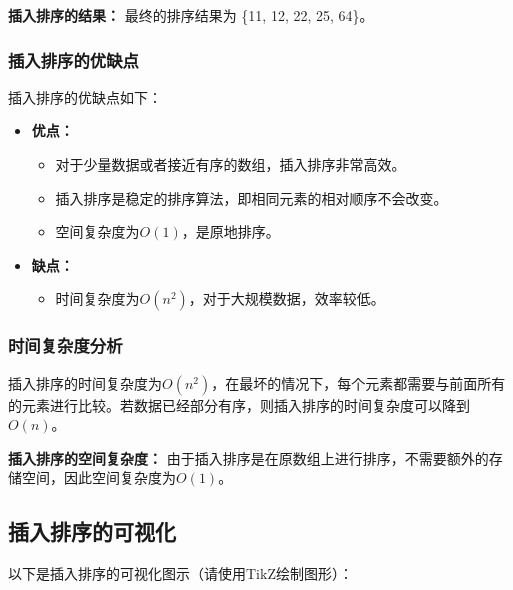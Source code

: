 \documentclass{article}
\begin{document}
\noindent
\textbf{插入排序的结果：}
最终的排序结果为 \{11, 12, 22, 25, 64\}。

\subsubsection{插入排序的优缺点}
插入排序的优缺点如下：

\begin{itemize}
    \item \textbf{优点：}
    \begin{itemize}
        \item 对于少量数据或者接近有序的数组，插入排序非常高效。
        \item 插入排序是稳定的排序算法，即相同元素的相对顺序不会改变。
        \item 空间复杂度为$O(1)$，是原地排序。
    \end{itemize}
    \item \textbf{缺点：}
    \begin{itemize}
        \item 时间复杂度为$O(n^2)$，对于大规模数据，效率较低。
    \end{itemize}
\end{itemize}

\subsubsection{时间复杂度分析}
插入排序的时间复杂度为$O(n^2)$，在最坏的情况下，每个元素都需要与前面所有的元素进行比较。若数据已经部分有序，则插入排序的时间复杂度可以降到$O(n)$。

\noindent
\textbf{插入排序的空间复杂度：}
由于插入排序是在原数组上进行排序，不需要额外的存储空间，因此空间复杂度为$O(1)$。

\subsection{插入排序的可视化}
以下是插入排序的可视化图示（请使用TikZ绘制图形）：

\end{document}
